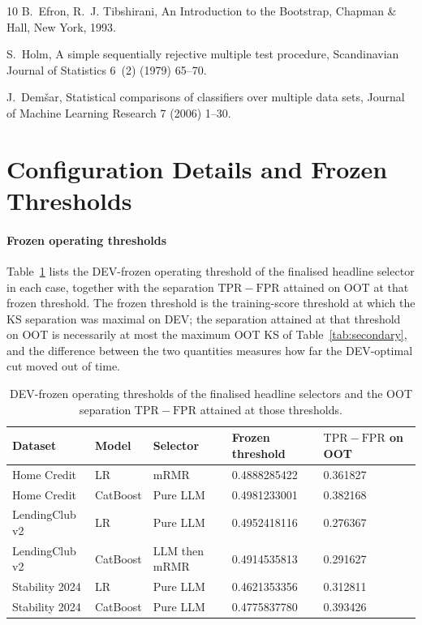 \documentclass[preprint,12pt]{elsarticle}
\newcommand{\TPR}{\mathrm{TPR}}
\newcommand{\FPR}{\mathrm{FPR}}
\begin{document}
\begin{thebibliography}{10}
B.~Efron, R.~J. Tibshirani, An Introduction to the Bootstrap, Chapman \& Hall,
  New York, 1993.

S.~Holm, A simple sequentially rejective multiple test procedure, Scandinavian
  Journal of Statistics 6~(2) (1979) 65--70.

J.~Dem{\v{s}}ar, Statistical comparisons of classifiers over multiple data
  sets, Journal of Machine Learning Research 7 (2006) 1--30.

\end{thebibliography}


\appendix

\section{Configuration Details and Frozen Thresholds}
\label{app:config}
\setcounter{table}{0}

\paragraph{Frozen operating thresholds}
Table~\ref{tab:thresholds} lists the DEV-frozen operating threshold of the finalised headline selector in each case, together with the separation $\TPR-\FPR$ attained on OOT at that frozen threshold. The frozen threshold is the training-score threshold at which the KS separation was maximal on DEV; the separation attained at that threshold on OOT is necessarily at most the maximum OOT KS of Table~\ref{tab:secondary}, and the difference between the two quantities measures how far the DEV-optimal cut moved out of time.

\begin{table}[htbp]
\centering
\scriptsize
\setlength{\tabcolsep}{4pt}
\begin{threeparttable}
\caption{DEV-frozen operating thresholds of the finalised headline selectors and the OOT separation $\TPR-\FPR$ attained at those thresholds.}
\label{tab:thresholds}
\begin{tabular}{@{}lllll@{}}
\toprule
Dataset & Model & Selector & Frozen threshold & $\TPR-\FPR$ on OOT \\
\midrule
Home Credit & LR & mRMR & 0.4888285422 & 0.361827 \\
Home Credit & CatBoost & Pure LLM & 0.4981233001 & 0.382168 \\
LendingClub v2 & LR & Pure LLM & 0.4952418116 & 0.276367 \\
LendingClub v2 & CatBoost & LLM then mRMR & 0.4914535813 & 0.291627 \\
Stability 2024 & LR & Pure LLM & 0.4621353356 & 0.312811 \\
Stability 2024 & CatBoost & Pure LLM & 0.4775837780 & 0.393426 \\
\bottomrule
\end{tabular}
\end{threeparttable}
\end{table}
\end{document}
